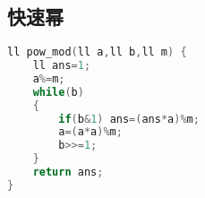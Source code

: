 \subsection{快速幂}
		\begin{lstlisting}[language=c++]
ll pow_mod(ll a,ll b,ll m) {
	ll ans=1;
	a%=m;
	while(b)
	{
		if(b&1) ans=(ans*a)%m;
		a=(a*a)%m;
		b>>=1;
	}
	return ans;
}
		\end{lstlisting}